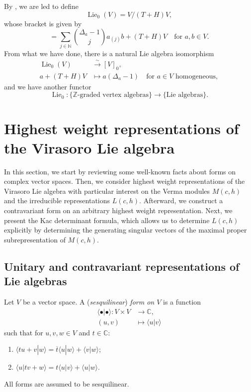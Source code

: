 \documentclass[a4paper, 12pt, reqno]{amsart}
\theoremstyle{remark}
\DeclareMathOperator{\Lie}{Lie}
\begin{document}
By , we are led to define
\begin{equation*}
  \Lie_0(V) = V/(T + H)V,
\end{equation*}
whose bracket is given by
\begin{equation*}
  [a + (T + H)V, b + (T + H)V] = \sum_{j \in \mathbb{N}}\binom{\Delta_a - 1}{j}a_{(j)}b + (T + H)V \quad \text{for $a, b \in V$}.
\end{equation*}
From what we have done, there is a natural Lie algebra isomorphism
\begin{align*}
  \Lie_0(V) &\xrightarrow{\sim} [V]_0, \\
  a + (T + H)V &\mapsto a(\Delta_a - 1) \quad \text{for $a \in V$ homogeneous},
\end{align*}
and we have another functor
\begin{equation*}
  \Lie_0: \{\text{$\mathbb{Z}$-graded vertex algebras}\} \to \{\text{Lie algebras}\}.
\end{equation*}

\section{Highest weight representations of the Virasoro Lie algebra}
\label{sec:high-weight-repr}

In this section, we start by reviewing some well-known facts about forms on complex vector spaces.
Then, we consider highest weight representations of the Virasoro Lie algebra with particular interest on the Verma modules $M(c, h)$ and the irreducible representations $L(c, h)$.
Afterward, we construct a contravariant form on an arbitrary highest weight representation.
Next, we present the Kac determinant formula, which allows us to determine $L(c, h)$ explicitly by determining the generating singular vectors of the maximal proper subrepresentation of $M(c, h)$.

\subsection{Unitary and contravariant representations of Lie algebras}
\label{sec:unit-contr-repr}

Let $V$ be a vector space.
A (\emph{sesquilinear}) \emph{form on $V$} is a function
\begin{align*}
  \langle \bullet| \bullet\rangle: V \times V &\to \mathbb{C}, \\
  (u, v) &\mapsto \langle u| v\rangle
\end{align*}
such that for $u, v, w \in V$ and $t \in \mathbb{C}$:
\begin{enumerate}
\item $\langle tu + v| w\rangle = \overline{t}\langle u| w\rangle + \langle v| w\rangle$;
\item $\langle u| tv + w\rangle = t\langle u| v\rangle + \langle u| w\rangle$.
\end{enumerate}
All forms are assumed to be sesquilinear.
\end{document}
